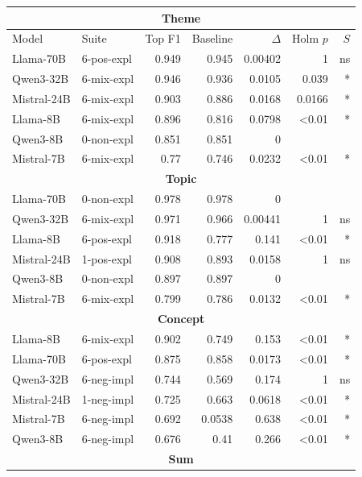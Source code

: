 \begin{table}
    \centering
    \scriptsize

    \begin{tabular}{ll|rrrrr}
    \toprule
    \multicolumn{7}{c}{\textbf{Theme}} \\
    \midrule
    Model & Suite & Top F1 & Baseline & $\Delta$ & Holm $p$ & $S$ \\
    \midrule
    Llama-70B & 6-pos-expl & 0.949 & 0.945 & 0.00402 & 1 & ns \\
    Qwen3-32B & 6-mix-expl & 0.946 & 0.936 & 0.0105 & 0.039 & * \\
    Mistral-24B & 6-mix-expl & 0.903 & 0.886 & 0.0168 & 0.0166 & * \\
    Llama-8B & 6-mix-expl & 0.896 & 0.816 & 0.0798 & <0.01 & * \\
    Qwen3-8B & 0-non-expl & 0.851 & 0.851 & 0 &  &  \\
    Mistral-7B & 6-mix-expl & 0.77 & 0.746 & 0.0232 & <0.01 & * \\
    \midrule
    \multicolumn{7}{c}{\textbf{Topic}} \\
    \midrule
    Llama-70B & 0-non-expl & 0.978 & 0.978 & 0 &  &  \\
    Qwen3-32B & 6-mix-expl & 0.971 & 0.966 & 0.00441 & 1 & ns \\
    Llama-8B & 6-pos-expl & 0.918 & 0.777 & 0.141 & <0.01 & * \\
    Mistral-24B & 1-pos-expl & 0.908 & 0.893 & 0.0158 & 1 & ns \\
    Qwen3-8B & 0-non-expl & 0.897 & 0.897 & 0 &  &  \\
    Mistral-7B & 6-mix-expl & 0.799 & 0.786 & 0.0132 & <0.01 & * \\
    \midrule
    \multicolumn{7}{c}{\textbf{Concept}} \\    
    \midrule
    Llama-8B & 6-mix-expl & 0.902 & 0.749 & 0.153 & <0.01 & * \\
    Llama-70B & 6-pos-expl & 0.875 & 0.858 & 0.0173 & <0.01 & * \\
    Qwen3-32B & 6-neg-impl & 0.744 & 0.569 & 0.174 & 1 & ns \\
    Mistral-24B & 1-neg-impl & 0.725 & 0.663 & 0.0618 & <0.01 & * \\
    Mistral-7B & 6-neg-impl & 0.692 & 0.0538 & 0.638 & <0.01 & * \\
    Qwen3-8B & 6-neg-impl & 0.676 & 0.41 & 0.266 & <0.01 & * \\
    \midrule
    \multicolumn{7}{c}{\textbf{Sum}} \\

\end{tabular}
\end{table}
